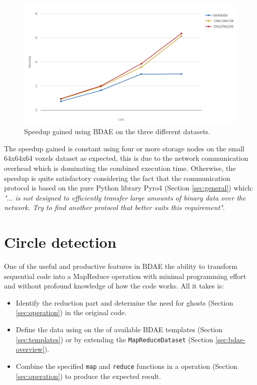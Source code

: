 \begin{figure}[h!]
	\centering
	\includegraphics[scale=0.4]{img/fdk-speedup.png}
	\caption[]{Speedup gained using BDAE on the three different datasets. \label{fig:fdk-speedup}}
\end{figure}

The speedup gained is constant using four or more storage nodes on the small 64x64x64 voxels dataset as expected, this is due to the network communication overhead which is dominating the combined execution time. Otherwise, the speedup is quite satisfactory considering the fact that the communication protocol is based on the pure Python library Pyro4 (Section \ref{sec:general}) which: \textit{"$\ldots$ is not designed to efficiently transfer large amounts of binary data over the network. Try to find another protocol that better suits this requirement"}\cite{PagePyro4}.

\section{Circle detection}
One of the useful and productive features in BDAE the ability to transform sequential code into a MapReduce operation with minimal programming effort and without profound knowledge of how the code works. All it takes is: 
\begin{itemize}
	\item Identify the reduction part and determine the need for ghosts (Section \ref{sec:operation}) in the original code.
	\item Define the data using on the of available BDAE templates (Section \ref{sec:templates}) or by extending the \texttt{MapReduceDataset} (Section \ref{sec:bdae-overview}).
	\item Combine the specified \texttt{map} and \texttt{reduce} functions in a operation (Section \ref{sec:operation}) to produce the expected result.
\end{itemize}

